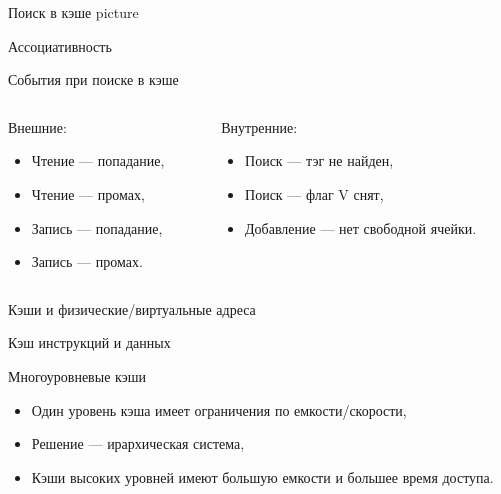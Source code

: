 \begin{frame}{Поиск в кэше}
\todo picture
\end{frame}

\begin{frame}{Ассоциативность}
\todo
\end{frame}

\begin{frame}{События при поиске в кэше}
\begin{columns}[t]
    \begin{column}[T]{0.5\textwidth}
    Внешние:
    \begin{itemize}
        \item Чтение --- попадание,
        \item Чтение --- промах,
        \item Запись --- попадание,
        \item Запись --- промах.
    \end{itemize}
    \end{column}
    \begin{column}[T]{0.5\textwidth}
    Внутренние:
    \begin{itemize}
        \item Поиск --- тэг не найден,
        \item Поиск --- флаг V снят,
        \item Добавление --- нет свободной ячейки.
    \end{itemize}
    \end{column}
\end{columns}
\end{frame}

\begin{frame}{Кэши и физические/виртуальные адреса}
\end{frame}

\begin{frame}{Кэш инструкций и данных}
\end{frame}

\begin{frame}{Многоуровневые кэши}
\begin{itemize}
    \item Один уровень кэша имеет ограничения по емкости/скорости,
    \item Решение --- ирархическая система,
    \item Кэши высоких уровней имеют большую емкости и большее время доступа.
\end{itemize}
\end{frame}

